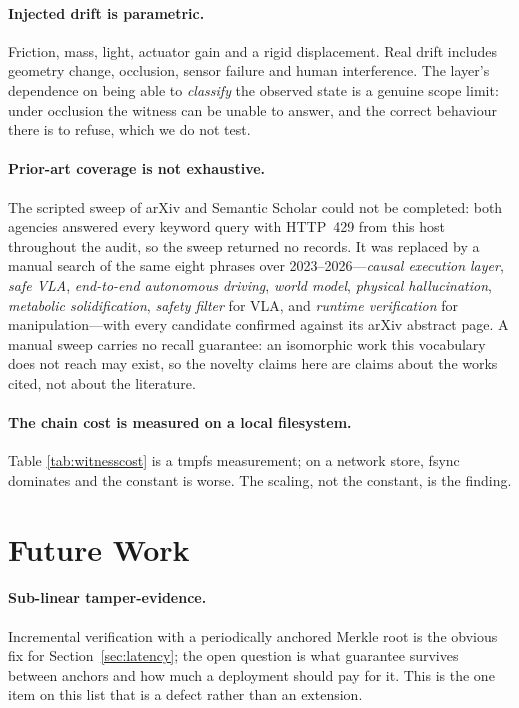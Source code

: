 \documentclass[conference]{IEEEtran}
\theoremstyle{definition}
\begin{document}
\paragraph{Injected drift is parametric.} Friction, mass, light, actuator gain
and a rigid displacement. Real drift includes geometry change, occlusion,
sensor failure and human interference. The layer's dependence on being able to
\emph{classify} the observed state is a genuine scope limit: under occlusion the
witness can be unable to answer, and the correct behaviour there is to refuse,
which we do not test.

\paragraph{Prior-art coverage is not exhaustive.} The scripted sweep of arXiv
and Semantic Scholar could not be completed: both agencies answered every keyword
query with HTTP~429 from this host throughout the audit, so the sweep returned no
records. It was replaced by a manual search of the same eight phrases over
2023--2026---\emph{causal execution layer}, \emph{safe VLA}, \emph{end-to-end
autonomous driving}, \emph{world model}, \emph{physical hallucination},
\emph{metabolic solidification}, \emph{safety filter} for VLA, and
\emph{runtime verification} for manipulation---with every candidate confirmed
against its arXiv abstract page. A manual sweep carries no recall guarantee: an
isomorphic work this vocabulary does not reach may exist, so the novelty claims
here are claims about the works cited, not about the literature.

\paragraph{The chain cost is measured on a local filesystem.} Table
\ref{tab:witnesscost} is a tmpfs measurement; on a network store, fsync
dominates and the constant is worse. The scaling, not the constant, is the
finding.

\section{Future Work}

\paragraph{Sub-linear tamper-evidence.} Incremental verification with a
periodically anchored Merkle root is the obvious fix for
Section~\ref{sec:latency}; the open question is what guarantee survives between
anchors and how much a deployment should pay for it. This is the one item on
this list that is a defect rather than an extension.
\end{document}

